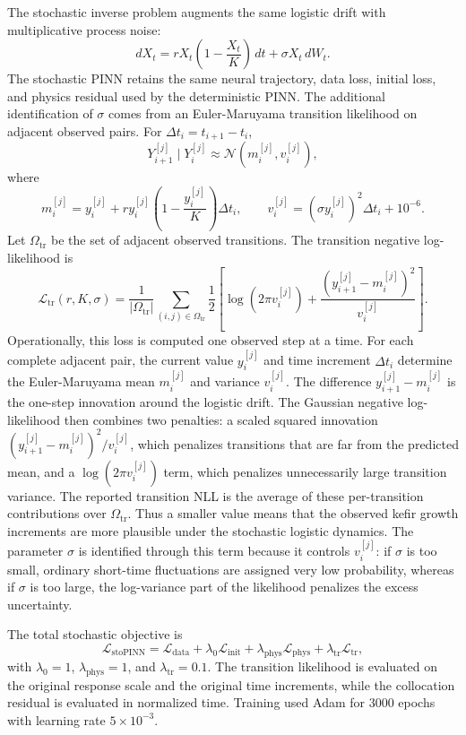 \documentclass[11pt]{article}
\begin{document}
The stochastic inverse problem augments the same logistic drift with
multiplicative process noise:
$$
  dX_t
  =
  rX_t\left(1-\frac{X_t}{K}\right)\,dt
  +
  \sigma X_t\,dW_t .
$$
The stochastic PINN retains the same neural trajectory, data loss, initial
loss, and physics residual used by the deterministic PINN. The additional
identification of $\sigma$ comes from an Euler-Maruyama transition likelihood
on adjacent observed pairs. For $\Delta t_i=t_{i+1}-t_i$,
$$
  Y_{i+1}^{[j]}\mid Y_i^{[j]}
  \approx
  \mathcal N(m_i^{[j]},v_i^{[j]}),
$$
where
$$
  m_i^{[j]}
  =
  y_i^{[j]}
  +
  r y_i^{[j]}\left(1-\frac{y_i^{[j]}}{K}\right)\Delta t_i,
  \qquad
  v_i^{[j]}
  =
  \left(\sigma y_i^{[j]}\right)^2\Delta t_i+10^{-6}.
$$
Let $\Omega_{\mathrm{tr}}$ be the set of adjacent observed transitions. The
transition negative log-likelihood is
$$
  \mathcal L_{\mathrm{tr}}(r,K,\sigma)
  =
  \frac{1}{|\Omega_{\mathrm{tr}}|}
  \sum_{(i,j)\in\Omega_{\mathrm{tr}}}
  \frac{1}{2}
  \left[
    \log(2\pi v_i^{[j]})
    +
    \frac{(y_{i+1}^{[j]}-m_i^{[j]})^2}{v_i^{[j]}}
  \right].
$$
Operationally, this loss is computed one observed step at a time. For each
complete adjacent pair, the current value $y_i^{[j]}$ and time increment
$\Delta t_i$ determine the Euler-Maruyama mean $m_i^{[j]}$ and variance
$v_i^{[j]}$. The difference $y_{i+1}^{[j]}-m_i^{[j]}$ is the one-step
innovation around the logistic drift. The Gaussian negative log-likelihood
then combines two penalties: a scaled squared innovation
$(y_{i+1}^{[j]}-m_i^{[j]})^2/v_i^{[j]}$, which penalizes transitions that are
far from the predicted mean, and a $\log(2\pi v_i^{[j]})$ term, which penalizes
unnecessarily large transition variance. The reported transition NLL is the
average of these per-transition contributions over $\Omega_{\mathrm{tr}}$.
Thus a smaller value means that the observed kefir growth increments are more
plausible under the stochastic logistic dynamics. The parameter $\sigma$ is
identified through this term because it controls $v_i^{[j]}$: if $\sigma$ is
too small, ordinary short-time fluctuations are assigned very low probability,
whereas if $\sigma$ is too large, the log-variance part of the likelihood
penalizes the excess uncertainty.

The total stochastic objective is
$$
  \mathcal L_{\mathrm{stoPINN}}
  =
  \mathcal L_{\mathrm{data}}
  +
  \lambda_0\mathcal L_{\mathrm{init}}
  +
  \lambda_{\mathrm{phys}}\mathcal L_{\mathrm{phys}}
  +
  \lambda_{\mathrm{tr}}\mathcal L_{\mathrm{tr}},
$$
with $\lambda_0=1$, $\lambda_{\mathrm{phys}}=1$, and
$\lambda_{\mathrm{tr}}=0.1$. The transition likelihood is evaluated on the
original response scale and the original time increments, while the
collocation residual is evaluated in normalized time. Training used Adam for
3000 epochs with learning rate $5\times10^{-3}$.
\end{document}
